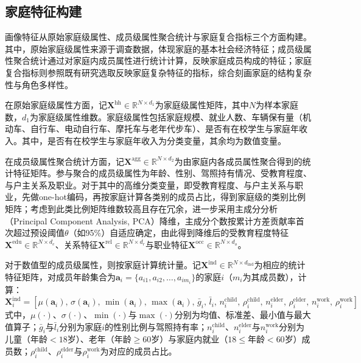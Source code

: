 \subsection{家庭特征构建}\label{subsec.popsyn.segment.feature}
 
画像特征从原始家庭级属性、成员级属性聚合统计与家庭复合指标三个方面构建。其中，原始家庭级属性来源于调查数据，体现家庭的基本社会经济特征；成员级属性聚合统计通过对家庭内成员属性进行统计计算，反映家庭成员构成的特征；家庭复合指标则参照既有研究选取反映家庭复杂特征的指标，综合刻画家庭的结构复杂性与角色多样性。
 
在原始家庭级属性方面，记$\mathbf{X}^{\text{hh}} \in \mathbb{R}^{N \times d_1}$为家庭级属性矩阵，其中$N$为样本家庭数，$d_1$为家庭级属性维数。家庭级属性包括家庭规模、就业人数、车辆保有量（机动车、自行车、电动自行车、摩托车与老年代步车）、是否有在校学生与家庭年收入。其中，是否有在校学生与家庭年收入为分类变量，其余均为数值变量。
 
在成员级属性聚合统计方面，记$\mathbf{X}^{\text{agg}} \in \mathbb{R}^{N \times d_2}$为由家庭内各成员属性聚合得到的统计特征矩阵。参与聚合的成员级属性为年龄、性别、驾照持有情况、受教育程度、与户主关系及职业。对于其中的高维分类变量，即受教育程度、与户主关系与职业，先做one-hot编码，再按家庭计算各类别的成员占比，得到家庭级的类别比例矩阵；考虑到此类比例矩阵维数较高且存在冗余，进一步采用主成分分析（Principal Component Analysis, PCA）降维，主成分个数按累计方差贡献率首次超过预设阈值$\theta$（如95\%）自适应确定，由此得到降维后的受教育程度特征$\mathbf{X}^{\text{edu}} \in \mathbb{R}^{N \times d_e}$、关系特征$\mathbf{X}^{\text{rel}} \in \mathbb{R}^{N \times d_r}$与职业特征$\mathbf{X}^{\text{occ}} \in \mathbb{R}^{N \times d_o}$。
 
对于数值型的成员级属性，则按家庭计算统计量。记$\mathbf{X}^{\text{ind}} \in \mathbb{R}^{N \times d_{\text{ind}}}$为相应的统计特征矩阵，对成员年龄集合为$\mathbf{a}_i = \{a_{i1}, a_{i2}, \ldots, a_{im_i}\}$的家庭$i$（$m_i$为其成员数），计算：
\begin{equation}
  \mathbf{X}^{\text{ind}}_i = \left[ \mu(\mathbf{a}_i),\, \sigma(\mathbf{a}_i),\, \min(\mathbf{a}_i),\, \max(\mathbf{a}_i),\, \bar{g}_i,\, \bar{l}_i,\, n^{\text{child}}_i,\, \rho^{\text{child}}_i,\, n^{\text{elder}}_i,\, \rho^{\text{elder}}_i,\, n^{\text{work}}_i,\, \rho^{\text{work}}_i \right]
  \label{eq.popsyn.xind}
\end{equation}
式中，$\mu(\cdot)$、$\sigma(\cdot)$、$\min(\cdot)$与$\max(\cdot)$分别为均值、标准差、最小值与最大值算子；$\bar{g}_i$与$\bar{l}_i$分别为家庭$i$的性别比例与驾照持有率；$n^{\text{child}}_i$、$n^{\text{elder}}_i$与$n^{\text{work}}_i$分别为儿童（年龄$<18$岁）、老年（年龄$\geq 60$岁）与家庭内就业（$18 \leq$年龄$< 60$岁）成员数；$\rho^{\text{child}}_i$、$\rho^{\text{elder}}_i$与$\rho^{\text{work}}_i$为对应的成员占比。
 
